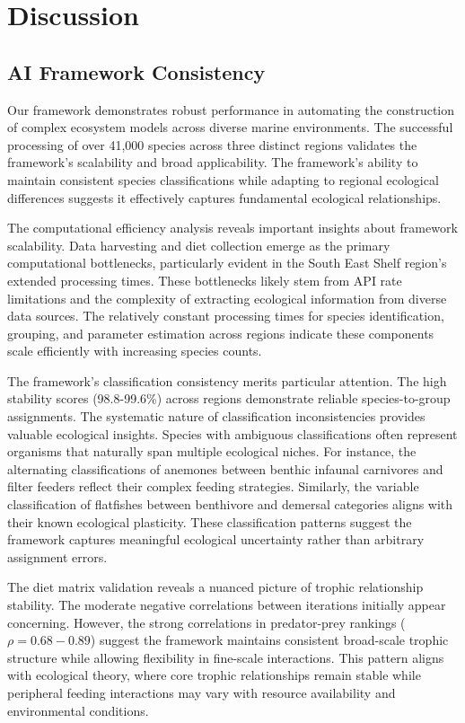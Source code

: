 \section{Discussion}

\subsection{AI Framework Consistency}
Our framework demonstrates robust performance in automating the construction of complex ecosystem models across diverse marine environments. The successful processing of over 41,000 species across three distinct regions validates the framework's scalability and broad applicability. The framework's ability to maintain consistent species classifications while adapting to regional ecological differences suggests it effectively captures fundamental ecological relationships.

The computational efficiency analysis reveals important insights about framework scalability. Data harvesting and diet collection emerge as the primary computational bottlenecks, particularly evident in the South East Shelf region's extended processing times. These bottlenecks likely stem from API rate limitations and the complexity of extracting ecological information from diverse data sources. The relatively constant processing times for species identification, grouping, and parameter estimation across regions indicate these components scale efficiently with increasing species counts.

The framework's classification consistency merits particular attention. The high stability scores (98.8-99.6\%) across regions demonstrate reliable species-to-group assignments. The systematic nature of classification inconsistencies provides valuable ecological insights. Species with ambiguous classifications often represent organisms that naturally span multiple ecological niches. For instance, the alternating classifications of anemones between benthic infaunal carnivores and filter feeders reflect their complex feeding strategies. Similarly, the variable classification of flatfishes between benthivore and demersal categories aligns with their known ecological plasticity. These classification patterns suggest the framework captures meaningful ecological uncertainty rather than arbitrary assignment errors.

The diet matrix validation reveals a nuanced picture of trophic relationship stability. The moderate negative correlations between iterations initially appear concerning. However, the strong correlations in predator-prey rankings ($\rho = 0.68-0.89$) suggest the framework maintains consistent broad-scale trophic structure while allowing flexibility in fine-scale interactions. This pattern aligns with ecological theory, where core trophic relationships remain stable while peripheral feeding interactions may vary with resource availability and environmental conditions.

